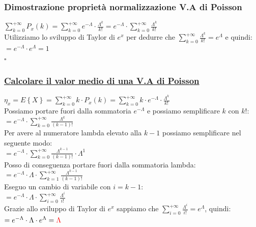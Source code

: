 \documentclass{article}
\begin{document}
\subsubsection{Dimostrazione proprietà normalizzazione V.A di Poisson}
$\sum_{k=0}^{+\infty} P_x(k) = \sum_{k=0}^{+\infty} e^{-\Lambda} \cdot \frac{\Lambda^k}{k!} = e^{-\Lambda} \cdot \sum_{k=0}^{+\infty} \frac{\Lambda^k}{k!}$ \\
Utilizziamo lo sviluppo di Taylor di $e^x$ per dedurre che $\sum_{k=0}^{+\infty} \frac{\Lambda^k}{k!} = e^\Lambda$ e quindi: \\
$= e^{-\Lambda} \cdot e^\Lambda = 1$ \\
\hspace*{0pt}\hfill $\square$
\subsubsection{\underline{Calcolare il valor medio di una V.A di Poisson}}
$\eta_x = E \left\{X\right\} = \sum_{k=0}^{+\infty} k \cdot P_x(k) = \sum_{k=0}^{+\infty} k \cdot e^{-\Lambda} \cdot \frac{\Lambda^k}{k!}$ \\
Possiamo portare fuori dalla sommatoria $e^{-\Lambda}$ e possiamo semplificare $k$ con $k!$: \\
$= e^{-\Lambda} \cdot \sum_{k=0}^{+\infty} \frac{\Lambda^k}{(k-1)!}$ \\
Per avere al numeratore lambda elevato alla $k-1$ possiamo semplificare nel seguente modo: \\
$= e^{-\Lambda} \cdot \sum_{k=0}^{+\infty} \frac{\Lambda^{k-1}}{(k-1)!} \cdot \Lambda^1$ \\
Posso di conseguenza portare fuori dalla sommatoria lambda: \\
$= e^{-\Lambda} \cdot \Lambda \cdot \sum_{k=1}^{+\infty} \frac{\Lambda^{k-1}}{(k-1)!} $ \\
Eseguo un cambio di variabile con $i = k-1$: \\
$= e^{-\Lambda} \cdot \Lambda \cdot \sum_{i=0}^{+\infty} \frac{\Lambda^{i}}{i!} $ \\
Grazie allo sviluppo di Taylor di $e^x$ sappiamo che $\sum_{i=0}^{+\infty} \frac{\Lambda^i}{i!} = e^\Lambda$, quindi: \\
$= e^{-\Lambda} \cdot \Lambda \cdot e^{\Lambda} = \color{red} \Lambda$
\end{document}
